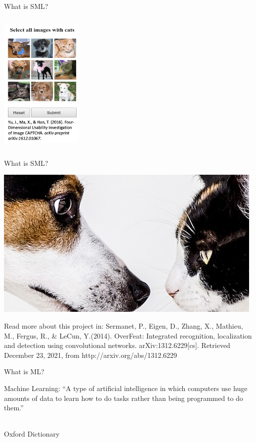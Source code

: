 \documentclass[compress]{beamer}
\begin{document}
\begin{frame}{What is SML?}
	
\begin{center}
	\includegraphics[width=4cm, height=7cm]{../pictures/CAPTCHA.png} 
\end{center}
\end{frame}


\begin{frame}{What is SML?}
	
\begin{center}
	\includegraphics{../pictures/dogvscat.png}
\end{center}
	
\begin{tiny}
Read more about this project in: Sermanet, P., Eigen, D., Zhang, X., Mathieu, M., Fergus, R., \& LeCun, Y.(2014). OverFeat: Integrated recognition, localization and detection using convolutional networks. arXiv:1312.6229[cs]. Retrieved December 23, 2021, from http://arxiv.org/abs/1312.6229
\end{tiny}
\end{frame}



\begin{frame}{What is ML?} 
	
Machine Learning: “A type of artificial intelligence in which computers use huge amounts of data to learn how to do tasks rather than being programmed to do them.” \\\
	
\begin{tiny}
	Oxford Dictionary
\end{tiny}
	
\end{frame}
\end{document}
